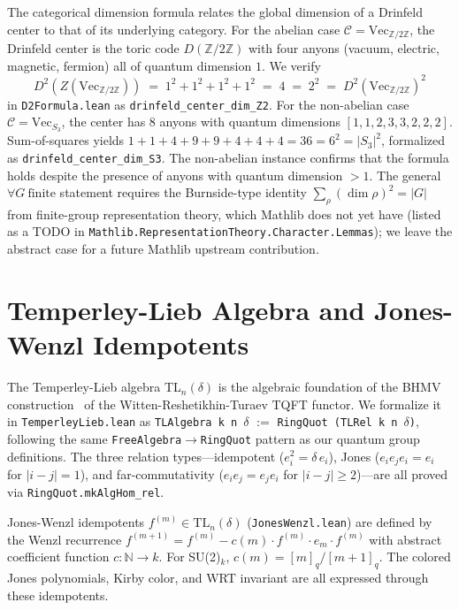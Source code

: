 \documentclass[12pt]{article}
\newcommand{\lean}[1]{\texttt{#1}}
\newcommand{\Zn}[1]{\mathbb{Z}/#1\mathbb{Z}}
\begin{document}
The categorical dimension formula relates the global dimension of a Drinfeld center to that of its underlying category. For the abelian case $\mathcal{C} = \mathrm{Vec}_{\Zn{2}}$, the Drinfeld center is the toric code $D(\Zn{2})$ with four anyons (vacuum, electric, magnetic, fermion) all of quantum dimension $1$. We verify
\[
D^2(Z(\mathrm{Vec}_{\Zn{2}})) \;=\; 1^2 + 1^2 + 1^2 + 1^2 \;=\; 4 \;=\; 2^2 \;=\; D^2(\mathrm{Vec}_{\Zn{2}})^2
\]
in \lean{D2Formula.lean} as \lean{drinfeld\_center\_dim\_Z2}. For the non-abelian case $\mathcal{C} = \mathrm{Vec}_{S_3}$, the center has $8$ anyons with quantum dimensions $[1, 1, 2, 3, 3, 2, 2, 2]$. Sum-of-squares yields $1+1+4+9+9+4+4+4 = 36 = 6^2 = |S_3|^2$, formalized as \lean{drinfeld\_center\_dim\_S3}. The non-abelian instance confirms that the formula holds despite the presence of anyons with quantum dimension $> 1$. The general $\forall G\ \text{finite}$ statement requires the Burnside-type identity $\sum_\rho (\dim \rho)^2 = |G|$ from finite-group representation theory, which Mathlib does not yet have (listed as a TODO in \lean{Mathlib.RepresentationTheory.Character.Lemmas}); we leave the abstract case for a future Mathlib upstream contribution.

\section{Temperley-Lieb Algebra and Jones-Wenzl Idempotents}
\label{sec:temperley-lieb}

The Temperley-Lieb algebra TL$_n(\delta)$ is the algebraic foundation
of the BHMV construction~\cite{bhmv1995} of the Witten-Reshetikhin-Turaev
TQFT functor. We formalize it in \texttt{TemperleyLieb.lean} as
\texttt{TLAlgebra\,k\,n\,$\delta$} $:=$ \texttt{RingQuot\,(TLRel\,k\,n\,$\delta$)},
following the same \texttt{FreeAlgebra}$\to$\texttt{RingQuot} pattern
as our quantum group definitions. The three relation types---idempotent
($e_i^2 = \delta\, e_i$), Jones ($e_i e_j e_i = e_i$ for $|i-j|=1$),
and far-commutativity ($e_i e_j = e_j e_i$ for $|i-j| \ge 2$)---are
all proved via \texttt{RingQuot.mkAlgHom\_rel}.

Jones-Wenzl idempotents $f^{(m)} \in \mathrm{TL}_n(\delta)$
(\texttt{JonesWenzl.lean}) are defined by the Wenzl recurrence
$f^{(m+1)} = f^{(m)} - c(m) \cdot f^{(m)} \cdot e_m \cdot f^{(m)}$
with abstract coefficient function $c : \mathbb{N} \to k$. For SU(2)$_k$,
$c(m) = [m]_q / [m+1]_q$. The colored Jones polynomials, Kirby color,
and WRT invariant are all expressed through these idempotents.
\end{document}

